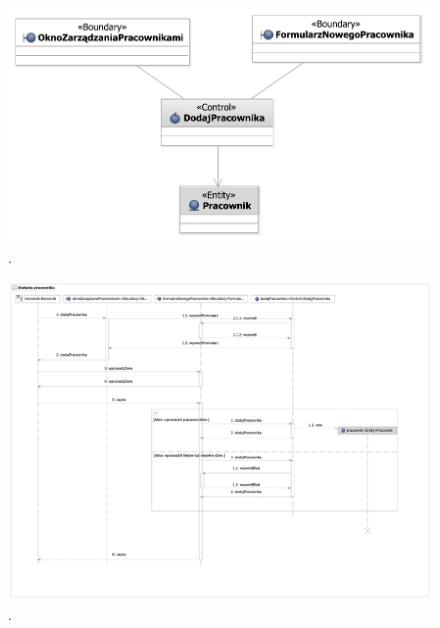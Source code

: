 \begin{figure}[H]
  \centering
  \includegraphics[angle=\ecbangle, scale=\ecbscale]{../img/usecase/pu2ecb.pdf}
  \caption{.}
\end{figure}
\begin{figure}[H]
  \centering
  \includegraphics[angle=\seqangle, scale=\seqscalemin]{../img/usecase/pu2seq.pdf}
  \caption{.}
\end{figure}
\newpage

